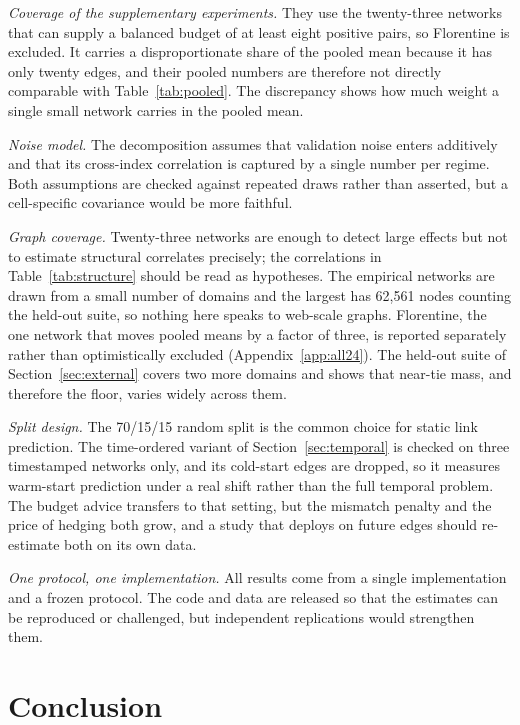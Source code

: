 \documentclass{comjnl}
\begin{document}
\emph{Coverage of the supplementary experiments.} They use the twenty-three networks that can supply a balanced budget of at least eight positive pairs, so Florentine is excluded. It carries a disproportionate share of the pooled mean because it has only twenty edges, and their pooled numbers are therefore not directly comparable with Table~\ref{tab:pooled}. The discrepancy shows how much weight a single small network carries in the pooled mean.

\emph{Noise model.} The decomposition assumes that validation noise enters additively and that its cross-index correlation is captured by a single number per regime. Both assumptions are checked against repeated draws rather than asserted, but a cell-specific covariance would be more faithful.

\emph{Graph coverage.} Twenty-three networks are enough to detect large effects but not to estimate structural correlates precisely; the correlations in Table~\ref{tab:structure} should be read as hypotheses. The empirical networks are drawn from a small number of domains and the largest has 62{,}561 nodes counting the held-out suite, so nothing here speaks to web-scale graphs. Florentine, the one network that moves pooled means by a factor of three, is reported separately rather than optimistically excluded (Appendix~\ref{app:all24}). The held-out suite of Section~\ref{sec:external} covers two more domains and shows that near-tie mass, and therefore the floor, varies widely across them.

\emph{Split design.} The 70/15/15 random split is the common choice for static link prediction. The time-ordered variant of Section~\ref{sec:temporal} is checked on three timestamped networks only, and its cold-start edges are dropped, so it measures warm-start prediction under a real shift rather than the full temporal problem. The budget advice transfers to that setting, but the mismatch penalty and the price of hedging both grow, and a study that deploys on future edges should re-estimate both on its own data.

\emph{One protocol, one implementation.} All results come from a single implementation and a frozen protocol. The code and data are released so that the estimates can be reproduced or challenged, but independent replications would strengthen them.

\section{Conclusion}
\label{sec:conclusion}
\end{document}
